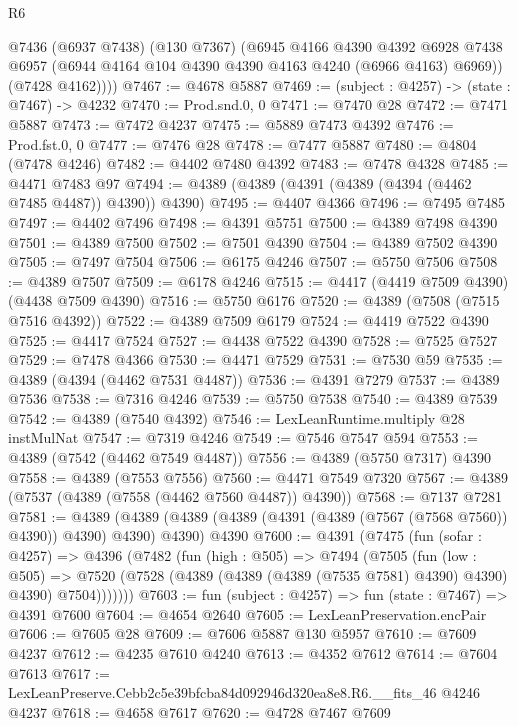 \begin{lexlean}{R6}
\begin{coremodule}
        @7436
          (@6937 @7438)
          (@130 @7367)
          (@6945
            @4166
            @4390
            @4392
            @6928
            @7438
            @6957
            (@6944 @4164 @104 @4390 @4390 @4163 @4240 (@6966 @4163) @6969))
          (@7428 @4162))))
@7467 := @4678 @5887
@7469 := (subject : @4257) -> (state : @7467) -> @4232
@7470 := Prod.snd.{0, 0}
@7471 := @7470 @28
@7472 := @7471 @5887
@7473 := @7472 @4237
@7475 := @5889 @7473 @4392
@7476 := Prod.fst.{0, 0}
@7477 := @7476 @28
@7478 := @7477 @5887
@7480 := @4804 (@7478 @4246)
@7482 := @4402 @7480 @4392
@7483 := @7478 @4328
@7485 := @4471 @7483 @97
@7494 := @4389 (@4389 (@4391 (@4389 (@4394 (@4462 @7485 @4487)) @4390)) @4390)
@7495 := @4407 @4366
@7496 := @7495 @7485
@7497 := @4402 @7496
@7498 := @4391 @5751
@7500 := @4389 @7498 @4390
@7501 := @4389 @7500
@7502 := @7501 @4390
@7504 := @4389 @7502 @4390
@7505 := @7497 @7504
@7506 := @6175 @4246
@7507 := @5750 @7506
@7508 := @4389 @7507
@7509 := @6178 @4246
@7515 := @4417 (@4419 @7509 @4390) (@4438 @7509 @4390)
@7516 := @5750 @6176
@7520 := @4389 (@7508 (@7515 @7516 @4392))
@7522 := @4389 @7509 @6179
@7524 := @4419 @7522 @4390
@7525 := @4417 @7524
@7527 := @4438 @7522 @4390
@7528 := @7525 @7527
@7529 := @7478 @4366
@7530 := @4471 @7529
@7531 := @7530 @59
@7535 := @4389 (@4394 (@4462 @7531 @4487))
@7536 := @4391 @7279
@7537 := @4389 @7536
@7538 := @7316 @4246
@7539 := @5750 @7538
@7540 := @4389 @7539
@7542 := @4389 (@7540 @4392)
@7546 := LexLeanRuntime.multiply @28 instMulNat
@7547 := @7319 @4246
@7549 := @7546 @7547 @594
@7553 := @4389 (@7542 (@4462 @7549 @4487))
@7556 := @4389 (@5750 @7317) @4390
@7558 := @4389 (@7553 @7556)
@7560 := @4471 @7549 @7320
@7567 := @4389 (@7537 (@4389 (@7558 (@4462 @7560 @4487)) @4390))
@7568 := @7137 @7281
@7581 := @4389
    (@4389 (@4389 (@4389 (@4391 (@4389 (@7567 (@7568 @7560)) @4390)) @4390) @4390) @4390)
    @4390
@7600 := @4391
    (@7475
      (fun (sofar : @4257) =>
      @4396
        (@7482
          (fun (high : @505) =>
          @7494
            (@7505
              (fun (low : @505) =>
              @7520 (@7528 (@4389 (@4389 (@4389 (@7535 @7581) @4390) @4390) @4390) @7504)))))))
@7603 := fun (subject : @4257) => fun (state : @7467) => @4391 @7600
@7604 := @4654 @2640
@7605 := LexLeanPreservation.encPair
@7606 := @7605 @28
@7609 := @7606 @5887 @130 @5957
@7610 := @7609 @4237
@7612 := @4235 @7610 @4240
@7613 := @4352 @7612
@7614 := @7604 @7613
@7617 := LexLeanPreserve.Cebb2c5e39bfcba84d092946d320ea8e8.R6.__fits_46 @4246 @4237
@7618 := @4658 @7617
@7620 := @4728 @7467 @7609

\end{coremodule}
\end{lexlean}
